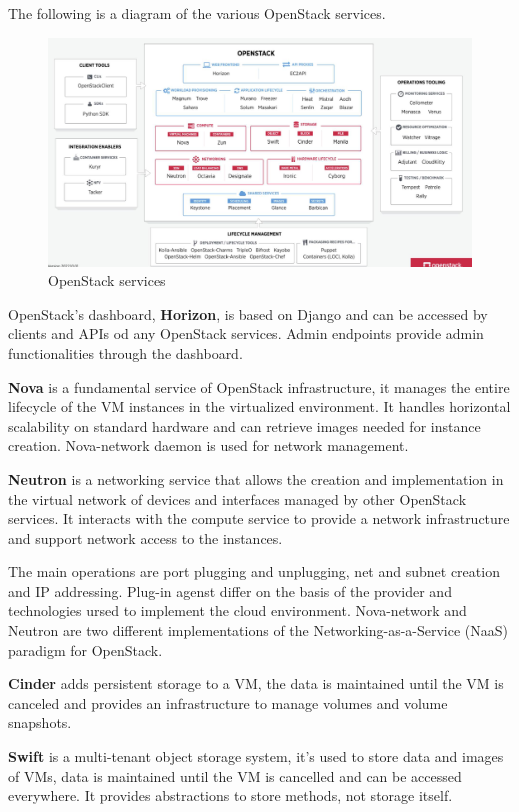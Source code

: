The following is a diagram of the various OpenStack services.
\begin{figure}
    \centering
    \includegraphics[scale=0.4]{img/OpenStack_Services.png}
    \caption{OpenStack services}
\end{figure}
OpenStack's dashboard, \textbf{Horizon}, is based on Django and can be accessed by clients and APIs
od any OpenStack services. Admin endpoints provide admin functionalities through the dashboard.

\textbf{Nova} is a fundamental service of OpenStack infrastructure, it manages the entire lifecycle of the VM instances in the virtualized environment. It handles horizontal scalability on standard hardware and can retrieve images needed for instance creation. Nova-network daemon is used for network management.

\textbf{Neutron} is a networking service that allows the creation and implementation in the virtual network of devices and interfaces managed by other OpenStack services. It interacts with the compute service to provide a network infrastructure and support network access to the instances.

The main operations are port plugging and unplugging, net and subnet creation and IP addressing.
Plug-in agenst differ on the basis of the provider and technologies ursed to implement the cloud
environment. Nova-network and Neutron are two different implementations of the
Networking-as-a-Service (NaaS) paradigm for OpenStack.

\textbf{Cinder} adds persistent storage to a VM, the data is maintained until the VM is canceled and provides an infrastructure to manage volumes and volume snapshots.

\textbf{Swift} is a multi-tenant object storage system, it's used to store data and images of VMs, data is maintained until the VM is cancelled and can be accessed everywhere. It provides abstractions to store methods, not storage itself.

